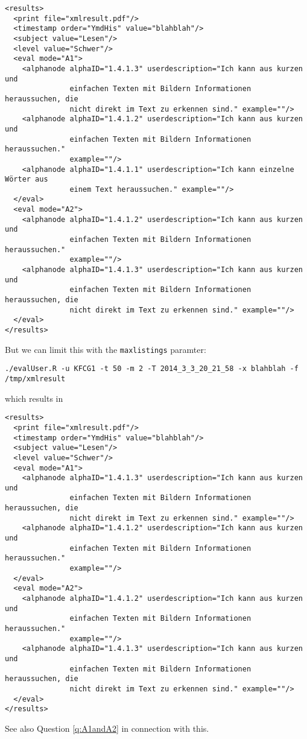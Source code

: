 \documentclass{scrartcl}
\begin{document}
\begin{verbatim}
<results>
  <print file="xmlresult.pdf"/>
  <timestamp order="YmdHis" value="blahblah"/>
  <subject value="Lesen"/>
  <level value="Schwer"/>
  <eval mode="A1">
    <alphanode alphaID="1.4.1.3" userdescription="Ich kann aus kurzen und 
               einfachen Texten mit Bildern Informationen heraussuchen, die 
               nicht direkt im Text zu erkennen sind." example=""/>
    <alphanode alphaID="1.4.1.2" userdescription="Ich kann aus kurzen und 
               einfachen Texten mit Bildern Informationen heraussuchen." 
               example=""/>
    <alphanode alphaID="1.4.1.1" userdescription="Ich kann einzelne Wörter aus 
               einem Text heraussuchen." example=""/>
  </eval>
  <eval mode="A2">
    <alphanode alphaID="1.4.1.2" userdescription="Ich kann aus kurzen und 
               einfachen Texten mit Bildern Informationen heraussuchen." 
               example=""/>
    <alphanode alphaID="1.4.1.3" userdescription="Ich kann aus kurzen und 
               einfachen Texten mit Bildern Informationen heraussuchen, die 
               nicht direkt im Text zu erkennen sind." example=""/>
  </eval>
</results>
\end{verbatim}
But we can limit this with the \verb+maxlistings+ paramter:
\begin{verbatim}
./evalUser.R -u KFCG1 -t 50 -m 2 -T 2014_3_3_20_21_58 -x blahblah -f /tmp/xmlresult
\end{verbatim}
which results in
\begin{verbatim}
<results>
  <print file="xmlresult.pdf"/>
  <timestamp order="YmdHis" value="blahblah"/>
  <subject value="Lesen"/>
  <level value="Schwer"/>
  <eval mode="A1">
    <alphanode alphaID="1.4.1.3" userdescription="Ich kann aus kurzen und 
               einfachen Texten mit Bildern Informationen heraussuchen, die 
               nicht direkt im Text zu erkennen sind." example=""/>
    <alphanode alphaID="1.4.1.2" userdescription="Ich kann aus kurzen und 
               einfachen Texten mit Bildern Informationen heraussuchen." 
               example=""/>
  </eval>
  <eval mode="A2">
    <alphanode alphaID="1.4.1.2" userdescription="Ich kann aus kurzen und 
               einfachen Texten mit Bildern Informationen heraussuchen." 
               example=""/>
    <alphanode alphaID="1.4.1.3" userdescription="Ich kann aus kurzen und 
               einfachen Texten mit Bildern Informationen heraussuchen, die 
               nicht direkt im Text zu erkennen sind." example=""/>
  </eval>
</results>
\end{verbatim}
See also Question \ref{q:A1andA2} in connection with this.
\end{document}

